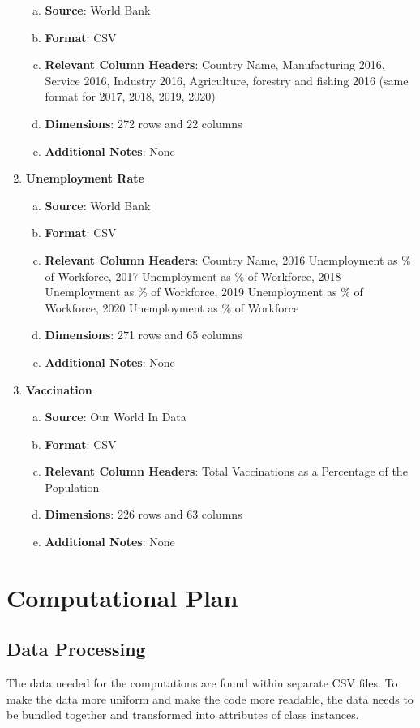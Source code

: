 \documentclass[fontsize=11pt]{article}
\begin{document}
\begin{enumerate}
\begin{enumerate}[(a)]
            \item \textbf{Source}: World Bank
            \item \textbf{Format}: CSV
            \item \textbf{Relevant Column Headers}: Country Name, Manufacturing 2016, Service 2016, Industry 2016, Agriculture, forestry and fishing 2016 (same format for 2017, 2018, 2019, 2020)
            \item \textbf{Dimensions}: 272 rows and 22 columns
            \item \textbf{Additional Notes}: None
        \end{enumerate}
    \item \textbf{Unemployment Rate}
        \begin{enumerate}[(a)]
            \item \textbf{Source}: World Bank
            \item \textbf{Format}: CSV
            \item \textbf{Relevant Column Headers}: Country Name, 2016 Unemployment as \% of Workforce, 2017 Unemployment as \% of Workforce, 2018 Unemployment as \% of Workforce, 2019 Unemployment as \% of Workforce, 2020 Unemployment as \% of Workforce
            \item \textbf{Dimensions}: 271 rows and 65 columns
            \item \textbf{Additional Notes}: None
        \end{enumerate}
    \item \textbf{Vaccination}
        \begin{enumerate}[(a)]
            \item \textbf{Source}: Our World In Data
            \item \textbf{Format}: CSV
            \item \textbf{Relevant Column Headers}: Total Vaccinations as a Percentage of the Population
            \item \textbf{Dimensions}: 226 rows and 63 columns
            \item \textbf{Additional Notes}: None
        \end{enumerate}
\end{enumerate}

\section*{Computational Plan}
    \subsection*{Data Processing}
    The data needed for the computations are found within separate CSV files. To make the data more uniform and make the code more readable, the data needs to be bundled together and transformed into attributes of class instances. \\
\end{document}
